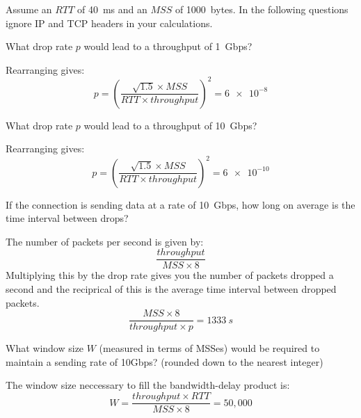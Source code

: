 \documentclass{supervision}
\begin{document}
\begin{questions}
\begin{parts}
          Assume an ${RTT}$ of \SI{40}{ms} and an ${MSS}$ of \SI{1000}{bytes}.
          In the following questions ignore IP and TCP headers in your
          calculations.

          \begin{subparts}
            \subpart What drop rate $p$ would lead to a throughput of
              \SI{1}{Gbps}?
              \begin{solution}
                Rearranging gives:
                \begin{equation*}
                  p = \left(
                    \frac{\sqrt{1.5} \times {MSS}}{RTT\times{throughput}}
                    \right)^2 = \num{6e-8}
                \end{equation*}
              \end{solution}

            \subpart What drop rate $p$ would lead to a throughput of
              \SI{10}{Gbps}?
              \begin{solution}
                Rearranging gives:
                \begin{equation*}
                  p = \left(
                    \frac{\sqrt{1.5} \times {MSS}}{RTT\times{throughput}}
                    \right)^2 = \num{6e-10}
                \end{equation*}
              \end{solution}

            \subpart If the connection is sending data at a rate of
              \SI{10}{Gbps}, how long on average is the time interval between
              drops?
              \begin{solution}
                The number of packets per second is given by:
                \begin{equation*}
                  \frac{{throughput}}{{MSS} \times 8}
                \end{equation*}
                Multiplying this by the drop rate gives you the number of
                packets dropped a second and the reciprical of this is the
                average time interval between dropped packets.
                \begin{equation*}
                  \frac{{MSS} \times 8}{{throughput} \times p} = \SI{1333}{s}
                \end{equation*}
              \end{solution}

            \subpart What window size $W$ (measured in terms of MSSes) would
              be required to maintain a sending rate of 10Gbps? (rounded down
              to the nearest integer)
              \begin{solution}
                The window size neccessary to fill the bandwidth-delay product
                is:
                \begin{equation*}
                  W = \frac{{throughput} \times {RTT}}{{MSS} \times 8} = 50,000
                \end{equation*}
              \end{solution}


\end{subparts}
\end{parts}
\end{questions}
\end{document}
